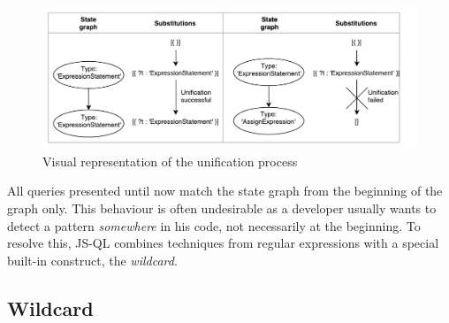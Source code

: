 \begin{figure}[!h]
    \centering
      \includegraphics[width=1\textwidth]{images/Unification} 
      \caption{Visual representation of the unification process}
    \label{fig:Unification}
\end{figure}

All queries presented until now match the state graph from the beginning of the graph only. This behaviour is often undesirable as a developer usually wants to detect a pattern \textit{somewhere} in his code, not necessarily at the beginning. To resolve this, JS-QL combines techniques from regular expressions with a special built-in construct, the \textit{wildcard}.


\subsection{Wildcard}

